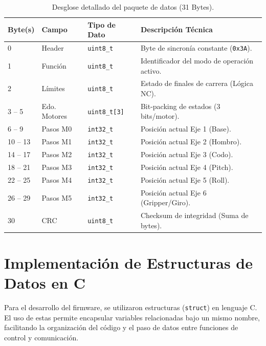 \begin{table}[h!]
	\centering
	\small
	\renewcommand{\arraystretch}{1.3} %
	\caption{Desglose detallado del paquete de datos (31 Bytes).}
	\label{tab:protocolo_detallado}
	\begin{tabularx}{\textwidth}{lllX}
		\hline
		\rowcolor{green!20} 
		\textbf{Byte(s)} & \textbf{Campo} & \textbf{Tipo de Dato} & \textbf{Descripción Técnica} \\ \hline
		0 & Header & \texttt{uint8\_t} & Byte de sincronía constante (\texttt{0x3A}). \\ \hline
		1 & Función & \texttt{uint8\_t} & Identificador del modo de operación activo. \\ \hline
		2 & Límites & \texttt{uint8\_t} & Estado de finales de carrera (Lógica NC). \\ \hline
		3 -- 5 & Edo. Motores & \texttt{uint8\_t[3]} & Bit-packing de estados (3 bits/motor). \\ \hline
		6 -- 9 & Pasos M0 & \texttt{int32\_t} & Posición actual Eje 1 (Base). \\ \hline
		10 -- 13 & Pasos M1 & \texttt{int32\_t} & Posición actual Eje 2 (Hombro). \\ \hline
		14 -- 17 & Pasos M2 & \texttt{int32\_t} & Posición actual Eje 3 (Codo). \\ \hline
		18 -- 21 & Pasos M3 & \texttt{int32\_t} & Posición actual Eje 4 (Pitch). \\ \hline
		22 -- 25 & Pasos M4 & \texttt{int32\_t} & Posición actual Eje 5 (Roll). \\ \hline
		26 -- 29 & Pasos M5 & \texttt{int32\_t} & Posición actual Eje 6 (Gripper/Giro). \\ \hline
		30 & CRC & \texttt{uint8\_t} & Checksum de integridad (Suma de bytes). \\ \hline
	\end{tabularx}
\end{table}


\section{Implementación de Estructuras de Datos en C}
Para el desarrollo del firmware, se utilizaron estructuras (\texttt{struct}) en lenguaje C. El uso de estas permite encapsular variables relacionadas bajo un mismo nombre, facilitando la organización del código y el paso de datos entre funciones de control y comunicación.


